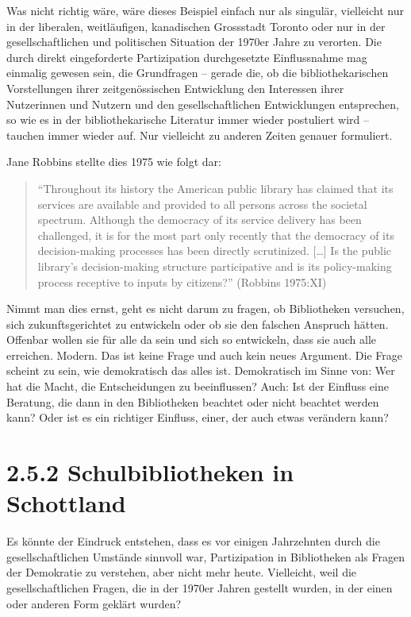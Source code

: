 \documentclass[a4paper,
fontsize=11pt,
oneside,
numbers=noperiodatend,
parskip=half-,
bibliography=totoc,
final
]{scrartcl}
\begin{document}
Was nicht richtig wäre, wäre dieses Beispiel einfach nur als singulär,
vielleicht nur in der liberalen, weitläufigen, kanadischen Grossstadt
Toronto oder nur in der gesellschaftlichen und politischen Situation der
1970er Jahre zu verorten. Die durch direkt eingeforderte Partizipation
durchgesetzte Einflussnahme mag einmalig gewesen sein, die Grundfragen
-- gerade die, ob die bibliothekarischen Vorstellungen ihrer
zeitgenössischen Entwicklung den Interessen ihrer Nutzerinnen und
Nutzern und den gesellschaftlichen Entwicklungen entsprechen, so wie es
in der bibliothekarische Literatur immer wieder postuliert wird --
tauchen immer wieder auf. Nur vielleicht zu anderen Zeiten genauer
formuliert.

Jane Robbins stellte dies 1975 wie folgt dar:

\begin{quote}
\enquote{Throughout its history the American public library has claimed
that its services are available and provided to all persons across the
societal spectrum. Although the democracy of its service delivery has
been challenged, it is for the most part only recently that the
democracy of its decision-making processes has been directly
scrutinized. {[}\ldots{}{]} Is the public library's decision-making
structure participative and is its policy-making process receptive to
inputs by citizens?} (Robbins 1975:XI)
\end{quote}

Nimmt man dies ernst, geht es nicht darum zu fragen, ob Bibliotheken
versuchen, sich zukunftsgerichtet zu entwickeln oder ob sie den falschen
Anspruch hätten. Offenbar wollen sie für alle da sein und sich so
entwickeln, dass sie auch alle erreichen. Modern. Das ist keine Frage
und auch kein neues Argument. Die Frage scheint zu sein, wie
demokratisch das alles ist. Demokratisch im Sinne von: Wer hat die
Macht, die Entscheidungen zu beeinflussen? Auch: Ist der Einfluss eine
Beratung, die dann in den Bibliotheken beachtet oder nicht beachtet
werden kann? Oder ist es ein richtiger Einfluss, einer, der auch etwas
verändern kann?

\section*{2.5.2 Schulbibliotheken in
Schottland}\label{schulbibliotheken-in-schottland}

Es könnte der Eindruck entstehen, dass es vor einigen Jahrzehnten durch
die gesellschaftlichen Umstände sinnvoll war, Partizipation in
Bibliotheken als Fragen der Demokratie zu verstehen, aber nicht mehr
heute. Vielleicht, weil die gesellschaftlichen Fragen, die in der 1970er
Jahren gestellt wurden, in der einen oder anderen Form geklärt wurden?
\end{document}

